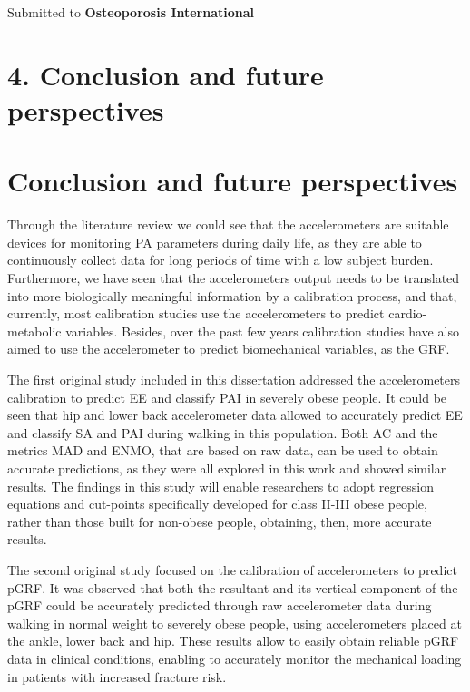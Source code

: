 \documentclass[12pt]{article}
\def\blankpage{%
      \clearpage%
      \thispagestyle{empty}%
      \addtocounter{page}{+0}%
      \null%
      \clearpage}
\begin{document}
\bigskip

\noindent Submitted to \textbf{Osteoporosis International}

\thispagestyle{empty}
\blankpage


\pagebreak

\section*{\vfill\raggedleft\bfseries 4. Conclusion and future perspectives}
\thispagestyle{empty} 
\blankpage

\section*{Conclusion and future perspectives}

Through the literature review we could see that the accelerometers are suitable devices for monitoring PA parameters during daily life, as they are able to continuously collect data for long periods of time with a low subject burden. Furthermore, we have seen that the accelerometers output needs to be translated into more biologically meaningful information by a calibration process, and that, currently, most calibration studies use the accelerometers to predict cardio-metabolic variables. Besides, over the past few years calibration studies have also aimed to use the accelerometer to predict biomechanical variables, as the GRF. 

The first original study included in this dissertation addressed the accelerometers calibration to predict EE and classify PAI in severely obese people. It could be seen that hip and lower back accelerometer data allowed to accurately predict EE and classify SA and PAI during walking in this population. Both AC and the metrics MAD and ENMO, that are based on raw data, can be used to obtain accurate predictions, as they were all explored in this work and showed similar results. The findings in this study will enable researchers to adopt regression equations and cut-points specifically developed for class II-III obese people, rather than those built for non-obese people, obtaining, then, more accurate results. 

The second original study focused on the calibration of accelerometers to predict pGRF. It was observed that both the resultant and its vertical component of the pGRF could be accurately predicted through raw accelerometer data during walking in normal weight to severely obese people, using accelerometers placed at the ankle, lower back and hip. These results allow to easily obtain reliable pGRF data in clinical conditions, enabling to accurately monitor the mechanical loading in patients with increased fracture risk.
\end{document}
